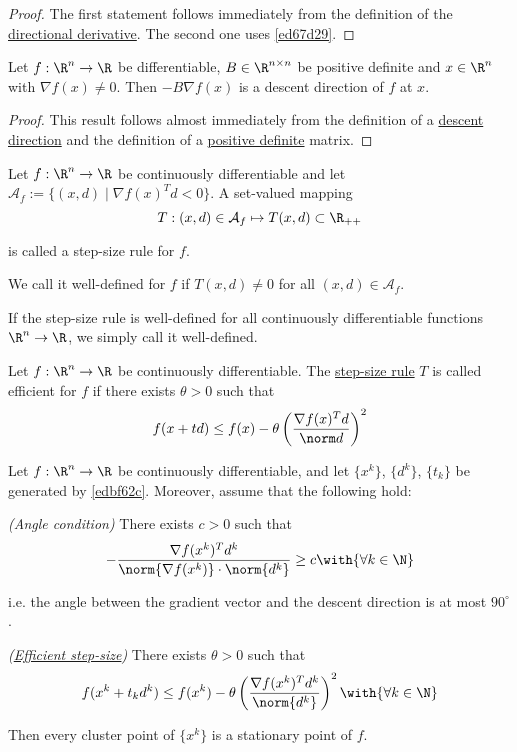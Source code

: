 \begin{proof}
  The first statement follows immediately from the definition of the
  \href{b7d1188}{directional derivative}. The second one uses
  \autoref{ed67d29}.
\end{proof}

\Corollary{}\label{c41d0f0}

Let $f:\R^n\to\R$ be differentiable, $B\in\R^{n\times n}$ be positive definite
and $x\in\R^n$ with $\nabla f(x)\neq0$. Then $-B\nabla f(x)$ is a descent
direction of $f$ at $x$.

\begin{proof}
  This result follows almost immediately from the definition of a
  \href{ac99a6d}{descent direction} and the definition of a
  \href{e25e722}{positive definite} matrix.
\end{proof}

\label{ae4eac6}

Let $f:{\R}^n\to{\R}$ be continuously differentiable and let $\mathcal
A_f:=\{(x,d)\mid\nabla f(x)^Td<0\}$. A set-valued mapping
$$
  T:(x,d)\in\mathcal A_f\mapsto T(x,d)\subset\R_{++}
$$

is called a step-size rule for $f$.

We call it well-defined for $f$ if $T(x,d)\neq0$ for all
$(x,d)\in\mathcal{A}_f$.

If the step-size rule is well-defined for all continuously differentiable
functions ${\R}^n\to{\R}$, we simply call it well-defined.

\label{d23fdf0}

Let $f:\R^n\to\R$ be continuously differentiable. The \href{ae4eac6}{step-size
rule} $T$ is called efficient for $f$ if there exists $\theta>0$ such that
$$
  f(x+td)\leq f(x)-\theta\left(\frac{\nabla f(x)^Td}{\norm d}\right)^2
$$

\label{aa19bbb}

Let $f:\R^n\to\R$ be continuously differentiable, and let $\{x^k\}$, $\{d^k\}$,
$\{t_k\}$ be generated by \autoref{edbf62c}. Moreover, assume that the
following hold:
\begin{enumerati}
  \item \textit{(Angle condition)} There exists $c>0$ such that
  $$
    -\frac{\nabla f(x^k)^Td^k}{\norm{\nabla f(x^k)}\cdot\norm{d^k}}\geq c\with{\forall k\in\N}
  $$

  i.e. the angle between the gradient vector and the descent direction is at
  most $90^\circ$.
  \item \textit{(\href{d23fdf0}{Efficient step-size})} There exists
  $\theta>0$ such that
  $$
    f(x^k+t_kd^k)\leq f(x^k)-\theta\left(
    \frac{\nabla f(x^k)^Td^k}{\norm{d^k}}
    \right)^2\with{\forall k\in\N}
  $$
\end{enumerati}
Then every cluster point of $\{x^k\}$ is a stationary point of $f$.

